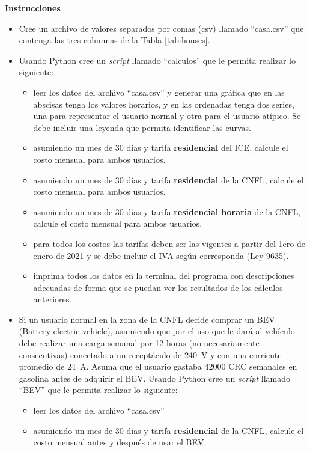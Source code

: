 \documentclass[12pt]{article}
\begin{document}
\noindent\textbf{Instrucciones}
\begin{itemize}
    \item Cree un archivo de valores separados por comas (csv) llamado ``casa.csv'' que contenga las tres columnas de la Tabla \ref{tab:houses}.
    \item Usando Python cree un \emph{script} llamado ``calculos'' que le permita realizar lo siguiente:
    \begin{itemize}
        \item leer los datos del archivo ``casa.csv'' y generar una gráfica que en las abscisas tenga los valores horarios, y en las ordenadas tenga dos series, una para representar el usuario normal y otra para el usuario atípico. Se debe incluir una leyenda que permita identificar las curvas.
        \item asumiendo un mes de 30 días y tarifa \textbf{residencial} del ICE, calcule el costo mensual para ambos usuarios.
        \item asumiendo un mes de 30 días y tarifa \textbf{residencial} de la CNFL, calcule el costo mensual para ambos usuarios.
        \item asumiendo un mes de 30 días y tarifa \textbf{residencial horaria} de la CNFL, calcule el costo mensual para ambos usuarios.
        \item para todos los costos las tarifas deben ser las vigentes a partir del 1ero de enero de 2021 y se debe incluir el IVA según corresponda (Ley 9635).
        \item imprima todos los datos en la terminal del programa con descripciones adecuadas de forma que se puedan ver los resultados de los cálculos anteriores.
    \end{itemize}
    \item Si un usuario normal en la zona de la CNFL decide comprar un BEV (Battery electric vehicle), asumiendo que por el uso que le dará al vehículo debe realizar una carga semanal por 12 horas (no necesariamente consecutivas) conectado a un receptáculo de \SI{240}{\volt} y con una corriente promedio de \SI{24}{\ampere}. Asuma que el usuario gastaba 42000 CRC semanales en gasolina antes de adquirir el BEV. Usando Python cree un \emph{script} llamado ``BEV'' que le permita realizar lo siguiente:
    \begin{itemize}
        \item leer los datos del archivo ``casa.csv''
        \item asumiendo un mes de 30 días y tarifa \textbf{residencial} de la CNFL, calcule el costo mensual antes y después de usar el BEV.

\end{itemize}
\end{itemize}
\end{document}
